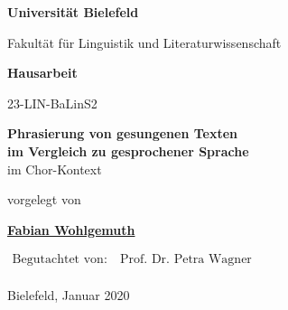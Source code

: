 \begin{center}

\Huge{\textbf{Universität Bielefeld}}

\LARGE{Fakultät für Linguistik und Literaturwissenschaft}

\vfill

\LARGE{\textbf{Hausarbeit}}

\Large

23-LIN-BaLinS2

\vfill


\vspace*{1cm}

\LARGE{\textbf{Phrasierung von gesungenen Texten\\im Vergleich zu gesprochener Sprache}\\im Chor-Kontext}

\Large

\vfill

vorgelegt von

\vspace*{1cm}

\textbf{\href{https://www.fabianwohlgemuth.de}{Fabian Wohlgemuth}}

\vfill

$\begin{aligned}
\text{Begutachtet von:}&\ \text{Prof. Dr. Petra Wagner}\\
\end{aligned}$

\vfill

Bielefeld, Januar 2020

\end{center}
\restoregeometry